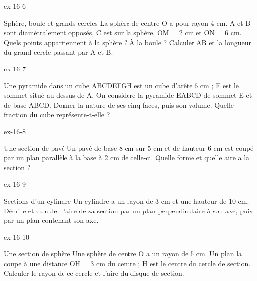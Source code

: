 \clearpage{}
\begin{blocLivre}{ex-16-6}\begin{exercice}[2]{Sphère, boule et grands cercles}
La sphère de centre O a pour rayon 4 cm. A et B sont diamétralement opposés, C est sur la sphère, OM = 2 cm et ON = 6 cm. Quels points appartiennent à la sphère ? À la boule ? Calculer AB et la longueur du grand cercle passant par A et B.
\label{fig-ex-16-6}
\end{exercice}\end{blocLivre}
\begin{blocLivre}{ex-16-7}\begin{exercice}[2]{Une pyramide dans un cube}
ABCDEFGH est un cube d’arête 6 cm ; E est le sommet situé au-dessus de A. On considère la pyramide EABCD de sommet E et de base ABCD. Donner la nature de ses cinq faces, puis son volume. Quelle fraction du cube représente-t-elle ?
\label{fig-ex-16-7}
\end{exercice}\end{blocLivre}
\begin{blocLivre}{ex-16-8}\begin{exercice}[2]{Une section de pavé}
Un pavé de base 8 cm sur 5 cm et de hauteur 6 cm est coupé par un plan parallèle à la base à 2 cm de celle-ci. Quelle forme et quelle aire a la section ?
\label{fig-ex-16-8}
\end{exercice}\end{blocLivre}
\begin{blocLivre}{ex-16-9}\begin{exercice}[2]{Sections d’un cylindre}
Un cylindre a un rayon de 3 cm et une hauteur de 10 cm. Décrire et calculer l’aire de sa section par un plan perpendiculaire à son axe, puis par un plan contenant son axe.
\label{fig-ex-16-9}
\end{exercice}\end{blocLivre}
\begin{blocLivre}{ex-16-10}\begin{exercice}[2]{Une section de sphère}
Une sphère de centre O a un rayon de 5 cm. Un plan la coupe à une distance OH = 3 cm du centre ; H est le centre du cercle de section. Calculer le rayon de ce cercle et l’aire du disque de section.
\label{fig-ex-16-10}
\end{exercice}\end{blocLivre}

